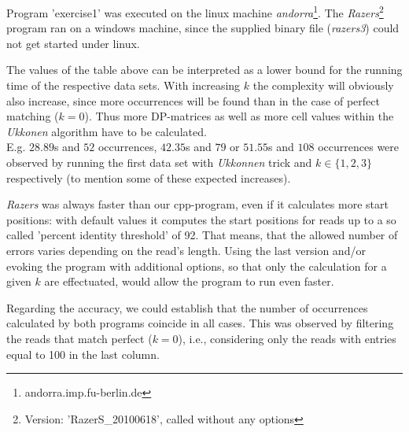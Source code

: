 \documentclass[11pt, notitlepage]{scrartcl}
\begin{document}
Program 'exercise1' was executed on the linux machine \textit{andorra}\footnote{andorra.imp.fu-berlin.de}.  The \textit{Razers}\footnote{Version: 'RazerS\_20100618', called without any options} program ran on a windows machine, since the supplied binary file (\textit{razers3}) could not get started under linux.

The values of the table above can be interpreted as a lower bound for the running time of the respective data sets. With increasing $k$ the complexity will obviously also increase, since more occurrences will be found  than in the case of perfect matching ($k=0$). Thus more DP-matrices as well as more cell values within the \textit{Ukkonen} algorithm have to be calculated. \\
E.g. $28.89$s and $52$ occurrences, $42.35$s and $79$ or $51.55$s and $108$ occurrences were observed by running the first data set with \textit{Ukkonnen} trick and $k \in \{1,2,3\}$ respectively (to mention some of these expected increases).

\textit{Razers} was always faster than our cpp-program, even if it calculates more start positions: with default values it computes the start positions for reads up to a so called 'percent identity threshold' of 92. That means, that the allowed number of errors varies depending on the read's length. Using the last version and/or evoking the program with additional options, so that only the calculation for a given $k$ are effectuated, would allow the program to run even faster.

Regarding the accuracy, we could establish that the number of occurrences calculated by both programs coincide in all cases. This was observed by filtering the reads that match perfect ($k=0$), i.e., considering only the reads with entries equal to 100 in the last column.   
\end{document}
